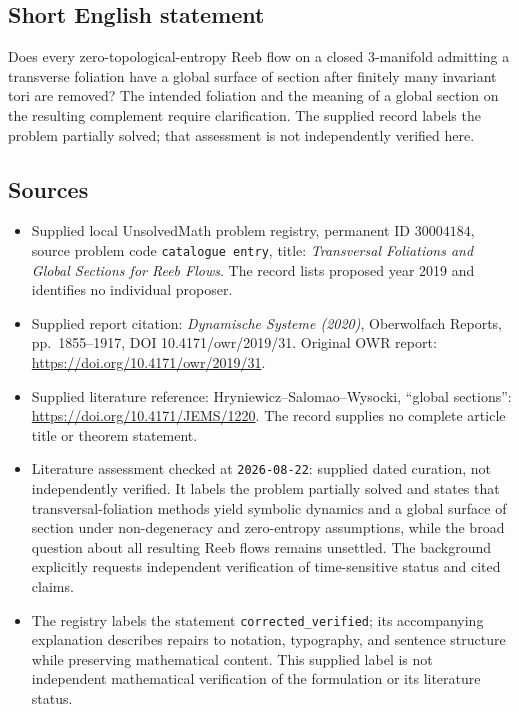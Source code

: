 \documentclass[11pt]{article}
\begin{document}
\subsection{Short English statement}
Does every zero-topological-entropy Reeb flow on a closed \(3\)-manifold admitting a transverse foliation have a global surface of section after finitely many invariant tori are removed? The intended foliation and the meaning of a global section on the resulting complement require clarification. The supplied record labels the problem partially solved; that assessment is not independently verified here.
\subsection{Sources}
\begin{itemize}
\item Supplied local UnsolvedMath problem registry, permanent ID \(30004184\), source problem code \texttt{catalogue entry}, title: \emph{Transversal Foliations and Global Sections for Reeb Flows}. The record lists proposed year 2019 and identifies no individual proposer.
\item Supplied report citation: \emph{Dynamische Systeme (2020)}, Oberwolfach Reports, pp.~1855--1917, DOI 10.4171/owr/2019/31. Original OWR report: \url{https://doi.org/10.4171/owr/2019/31}.
\item Supplied literature reference: Hryniewicz--Salomao--Wysocki, ``global sections'': \url{https://doi.org/10.4171/JEMS/1220}. The record supplies no complete article title or theorem statement.
\item Literature assessment checked at \texttt{2026-08-22}: supplied dated curation, not independently verified. It labels the problem partially solved and states that transversal-foliation methods yield symbolic dynamics and a global surface of section under non-degeneracy and zero-entropy assumptions, while the broad question about all resulting Reeb flows remains unsettled. The background explicitly requests independent verification of time-sensitive status and cited claims.
\item The registry labels the statement \texttt{corrected\_verified}; its accompanying explanation describes repairs to notation, typography, and sentence structure while preserving mathematical content. This supplied label is not independent mathematical verification of the formulation or its literature status.
\end{itemize}
\end{document}
